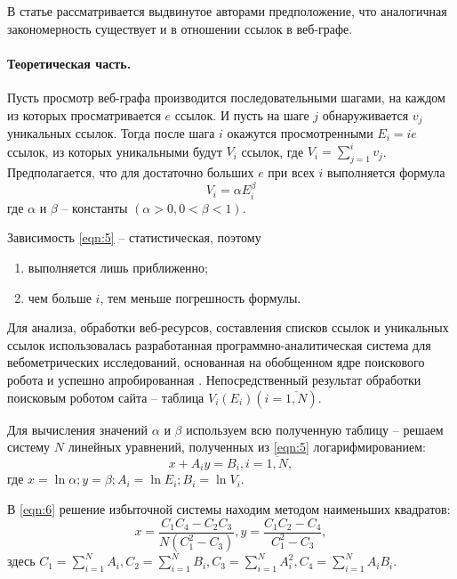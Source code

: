 В статье рассматривается выдвинутое авторами предположение, что аналогичная закономерность существует и в отношении ссылок в веб-графе.

\paragraph{Теоретическая часть.} Пусть просмотр веб-графа производится последовательными шагами, на каждом из которых просматривается \(e\) ссылок. И пусть на шаге \(j\) обнаруживается \(v_j\) уникальных ссылок. Тогда после шага \(i\) окажутся просмотренными \(E_i = ie\) ссылок, из которых уникальными будут \(V_i\) ссылок, где \(V_i = \sum_{j=1}^{i} v_j\). Предполагается, что для достаточно больших \(e\) при всех \(i\) выполняется формула
\begin{equation}
	\label{eqn:5}
	V_i = \alpha E_i^\beta
\end{equation}
где \(\alpha\) и \(\beta\) -- константы \((\alpha > 0, 0 < \beta < 1)\).

Зависимость \cref{eqn:5} -- статистическая, поэтому
\begin{enumerate}
	\item выполняется лишь приближенно;
	\item чем больше \(i\), тем меньше погрешность формулы.
\end{enumerate}

Для анализа, обработки веб-ресурсов, составления списков ссылок и уникальных
ссылок использовалась разработанная программно-аналитическая система для вебометрических исследований, основанная на обобщенном ядре поискового робота \cite{BlekanovSergeevMartynenko} и успешно апробированная \cite{MaksimovBlekanov,BlekanovSergeevMaksimovBOWTIE}. Непосредственный результат обработки поисковым роботом сайта -- таблица \(V_i (E_i) (i = \overline{1,N})\).

Для вычисления значений \(\alpha\) и \(\beta\) используем всю полученную таблицу -- решаем систему \(N\) линейных уравнений, полученных из \cref{eqn:5} логарифмированием:
\begin{equation}
	\label{eqn:6}
	x + A_i y = B_i, i = \overline{1,N},
\end{equation} где \(x = \ln{\alpha}; y = \beta; A_i = \ln{E_i}; B_i = \ln{V_i}\).

В \cref{eqn:6} решение избыточной системы находим методом наименьших квадратов:
\[
x = \frac{C_1 C_4 - C_2 C_3}{N (C_1^2 - C_3)}, y = \frac{C_1 C_2 - C_4}{C_1^2 - C_3},
\] здесь \( C_1 = \sum_{i=1}^{N} A_i, C_2 = \sum_{i = 1}^{N} B_i, C_3 = \sum_{i = 1}^{N} A_i^2 , C_4 = \sum_{i=1}^{N} A_i B_i .\)

